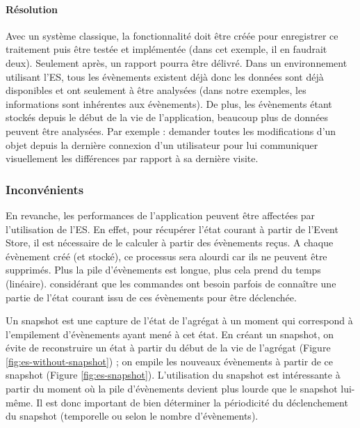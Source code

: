 \paragraph{Résolution} Avec un système classique, la fonctionnalité doit être 
créée pour enregistrer ce traitement puis être testée et implémentée (dans cet 
exemple, il en faudrait deux). Seulement après, un rapport pourra être délivré. 
Dans un environnement utilisant l'\gls{ES}, tous les évènements existent déjà 
donc les données sont déjà disponibles et ont seulement à être analysées 
(dans 
notre exemples, les informations sont inhérentes aux évènements). De plus, les 
évènements étant stockés depuis le début de la vie de l'application, beaucoup plus de données peuvent être analysées. Par 
exemple : demander toutes les modifications d'un objet depuis la dernière 
connexion d'un utilisateur pour lui communiquer visuellement les différences par 
rapport à sa dernière visite.



\subsubsection{Inconvénients}
En revanche, les performances de l'application peuvent être affectées par 
l'utilisation de 
l'\gls{ES}. En effet, pour récupérer l'état courant à partir de l'Event Store, il est 
nécessaire de le calculer à partir des évènements reçus.
A chaque évènement créé (et stocké), ce processus sera alourdi car ils ne 
peuvent être supprimés. Plus la pile d'évènements est longue, plus cela prend 
du temps (linéaire).
 considérant que les commandes ont besoin parfois de connaître une partie de 
 l'état courant issu de ces évènements pour être déclenchée.
 
Un \gls{snapshot} est une capture de l'état de l'agrégat à un 
moment qui correspond à l'empilement d'évènements ayant mené à cet état. En 
créant un \gls{snapshot}, on évite de reconstruire un état à partir du début de la 
vie de l'agrégat (Figure \ref{fig:es-without-snapshot}) ; on empile les nouveaux 
évènements à partir de ce snapshot (Figure \ref{fig:es-snapshot}). 
L'utilisation du \gls{snapshot} est intéressante à partir du moment où la pile 
d'évènements devient plus lourde que le \gls{snapshot} lui-même. Il est donc 
important de bien déterminer la périodicité du déclenchement du \gls{snapshot} 
(temporelle ou selon le nombre d'évènements).


